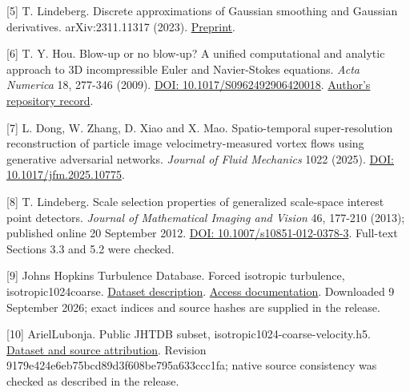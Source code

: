 \documentclass[
]{article}
\begin{document}
{[}5{]} T. Lindeberg. Discrete approximations of Gaussian smoothing and
Gaussian derivatives. arXiv:2311.11317 (2023).
\href{https://arxiv.org/abs/2311.11317}{Preprint}.

{[}6{]} T. Y. Hou. Blow-up or no blow-up? A unified computational and
analytic approach to 3D incompressible Euler and Navier-Stokes
equations. \emph{Acta Numerica} 18, 277-346 (2009).
\href{https://doi.org/10.1017/S0962492906420018}{DOI:
10.1017/S0962492906420018}.
\href{https://authors.library.caltech.edu/records/h8j4g-x8c18}{Author's
repository record}.

{[}7{]} L. Dong, W. Zhang, D. Xiao and X. Mao. Spatio-temporal
super-resolution reconstruction of particle image velocimetry-measured
vortex flows using generative adversarial networks. \emph{Journal of
Fluid Mechanics} 1022 (2025).
\href{https://doi.org/10.1017/jfm.2025.10775}{DOI:
10.1017/jfm.2025.10775}.

{[}8{]} T. Lindeberg. Scale selection properties of generalized
scale-space interest point detectors. \emph{Journal of Mathematical
Imaging and Vision} 46, 177-210 (2013); published online 20 September
2012.
\href{https://link.springer.com/article/10.1007/s10851-012-0378-3}{DOI:
10.1007/s10851-012-0378-3}. Full-text Sections 3.3 and 5.2 were checked.

{[}9{]} Johns Hopkins Turbulence Database. Forced isotropic turbulence,
isotropic1024coarse.
\href{https://turbulence.idies.jhu.edu/datasets/homogeneousTurbulence/isotropic}{Dataset
description}. \href{https://turbulence.idies.jhu.edu/database}{Access
documentation}. Downloaded 9 September 2026; exact indices and source
hashes are supplied in the release.

{[}10{]} ArielLubonja. Public JHTDB subset,
isotropic1024-coarse-velocity.h5.
\href{https://huggingface.co/datasets/ArielLubonja/johns-hopkins-turbulence-database}{Dataset
and source attribution}. Revision
9179e424e6eb75bcd89d3f608be795a633ccc1fa; native source consistency was
checked as described in the release.
\end{document}
